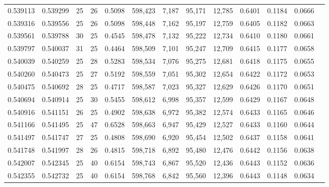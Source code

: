 \begin{tabular}{rrrrrrrrrrrrr}
0.539113 & 0.539299 &    25 &  26 &                                     0.5098 & 598,423 &   7,187 &  95,171 &  12,785 & 0.6401 & 0.1184 & 0.0666 \\
0.539316 & 0.539556 &    25 &  26 &                                     0.5098 & 598,448 &   7,162 &  95,197 &  12,759 & 0.6405 & 0.1182 & 0.0663 \\
0.539561 & 0.539788 &    30 &  25 &                                     0.4545 & 598,478 &   7,132 &  95,222 &  12,734 & 0.6410 & 0.1180 & 0.0661 \\
0.539797 & 0.540037 &    31 &  25 &                                     0.4464 & 598,509 &   7,101 &  95,247 &  12,709 & 0.6415 & 0.1177 & 0.0658 \\
0.540039 & 0.540259 &    25 &  28 &                                     0.5283 & 598,534 &   7,076 &  95,275 &  12,681 & 0.6418 & 0.1175 & 0.0655 \\
0.540260 & 0.540473 &    25 &  27 &                                     0.5192 & 598,559 &   7,051 &  95,302 &  12,654 & 0.6422 & 0.1172 & 0.0653 \\
0.540475 & 0.540692 &    28 &  25 &                                     0.4717 & 598,587 &   7,023 &  95,327 &  12,629 & 0.6426 & 0.1170 & 0.0651 \\
0.540694 & 0.540914 &    25 &  30 &                                     0.5455 & 598,612 &   6,998 &  95,357 &  12,599 & 0.6429 & 0.1167 & 0.0648 \\
0.540916 & 0.541151 &    26 &  25 &                                     0.4902 & 598,638 &   6,972 &  95,382 &  12,574 & 0.6433 & 0.1165 & 0.0646 \\
0.541166 & 0.541495 &    25 &  47 &                                     0.6528 & 598,663 &   6,947 &  95,429 &  12,527 & 0.6433 & 0.1160 & 0.0644 \\
0.541497 & 0.541747 &    27 &  25 &                                     0.4808 & 598,690 &   6,920 &  95,454 &  12,502 & 0.6437 & 0.1158 & 0.0641 \\
0.541748 & 0.541997 &    28 &  26 &                                     0.4815 & 598,718 &   6,892 &  95,480 &  12,476 & 0.6442 & 0.1156 & 0.0638 \\
0.542007 & 0.542345 &    25 &  40 &                                     0.6154 & 598,743 &   6,867 &  95,520 &  12,436 & 0.6443 & 0.1152 & 0.0636 \\
0.542355 & 0.542732 &    25 &  40 &                                     0.6154 & 598,768 &   6,842 &  95,560 &  12,396 & 0.6443 & 0.1148 & 0.0634 \\

\end{tabular}
